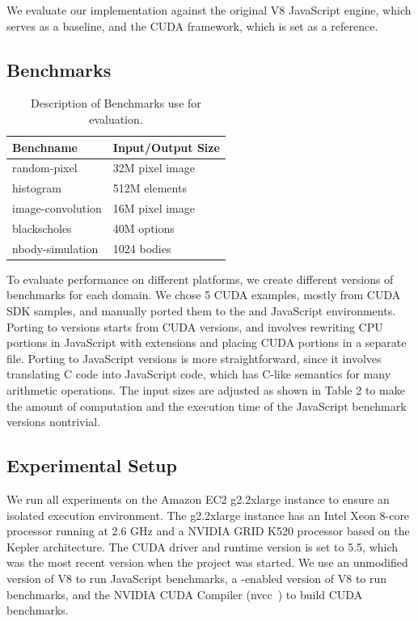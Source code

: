 We evaluate our \name implementation against the original V8 JavaScript
engine, which serves as a baseline, and the CUDA framework, which is set as a
reference.

\subsection{Benchmarks}
\begin{table}
	\begin{center}
		\begin{tabular}{| l | l |}
			\hline
			Benchname & Input/Output Size \\
			\hline
			random-pixel & 32M pixel image \\
			\hline
			histogram & 512M elements \\
			\hline
			image-convolution & 16M pixel image \\
			\hline
			blackscholes & 40M options \\
			\hline
			nbody-simulation & 1024 bodies \\
			\hline
		\end{tabular}
	\end{center}
	\caption{Description of Benchmarks use for evaluation.}
	\label{benchmark-table}
\end{table}

To evaluate performance on different platforms, we create different versions of
benchmarks for each domain. We chose 5 CUDA examples, mostly from CUDA SDK
samples, and manually ported them to the \name and JavaScript environments.
Porting to \name versions starts from CUDA versions, and involves rewriting CPU
portions in JavaScript with \name extensions and placing CUDA portions in a
separate file. Porting to JavaScript versions is more straightforward, since it
involves translating C code into JavaScript code, which has C-like semantics
for many arithmetic operations.  The input sizes are adjusted as shown in Table
2 to make the amount of computation and the execution time of the JavaScript
benchmark versions nontrivial.

\subsection{Experimental Setup} We run all experiments on the Amazon EC2
\cite{amazonEC2} g2.2xlarge instance to ensure an isolated execution
environment. The g2.2xlarge instance has an Intel Xeon 8-core processor running
at 2.6 GHz and a NVIDIA GRID K520 processor based on the Kepler architecture.
The CUDA driver and runtime version is set to 5.5, which was the most recent
version when the project was started. We use an unmodified version of V8 to run JavaScript benchmarks, a \namens-enabled version of V8 to run \name benchmarks, and the NVIDIA CUDA Compiler (nvcc~\cite{nvcc}) to build CUDA benchmarks.

